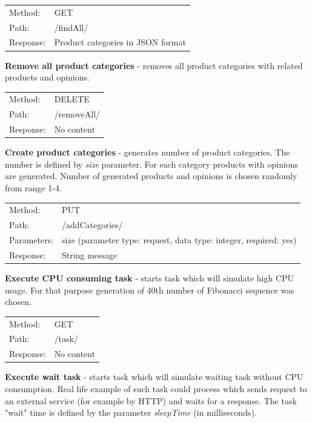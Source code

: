\documentclass[12pt,a4paper]{article}
\begin{document}
{\renewcommand{\arraystretch}{1}
  \begin{tabular}{ll}
  Method: & GET \\
  Path: & /findAll/ \\
  Response: & Product categories in JSON format  \\
  \end{tabular} \vspace{5mm}
}

\noindent\textbf{Remove all product categories} - removes all product categories with related products and opinions.

{\renewcommand{\arraystretch}{1}
  \begin{tabular}{ll}
  Method: & DELETE \\
  Path: & /removeAll/ \\
  Response: & No content  \\
  \end{tabular} \vspace{5mm}
}
  
\noindent\textbf{Create product categories} - generates number of product categories. The number is defined by \textit{size} parameter. For each category products with opinions are generated. Number of generated products and opinions is chosen randomly from range 1-4. 

{\renewcommand{\arraystretch}{1}
  \begin{tabular}{ll}
  Method: & PUT \\
  Path: & /addCategories/ \\
  Parameters: & size (parameter type: request, data type: integer, required: yes)\\
  Response: & String message  \\
  \end{tabular} \vspace{5mm}
}

\noindent\textbf{Execute CPU consuming task} - starts task which will simulate high CPU usage. For that purpose generation of 40th number of Fibonacci sequence was chosen. 

{\renewcommand{\arraystretch}{1}
  \begin{tabular}{ll}
  Method: & GET \\
  Path: & /task/ \\
  Response: & No content  \\
  \end{tabular} \vspace{2mm}
}

\noindent\textbf{Execute wait task} - starts task which will simulate waiting task without CPU consumption. Real life example of such task could process which sends request to an external service (for example by HTTP) and waits for a response. The task "wait" time is defined by the parameter \textit{sleepTime} (in milliseconds). 
\end{document}
